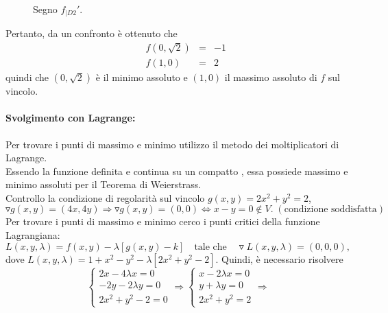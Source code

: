 \begin{example}
\begin{itemize}
\begin{figure}[ht!]
			\caption{Segno $f_{|D2}'$.}
			\label{fig:f'_vincolata_1>0}
		\end{figure}
	\end{itemize}
	Pertanto, da un confronto è ottenuto che
	\begin{equation*}
		\begin{matrix}
			&& f(0,\sqrt{2}) &=&-1\\
			&&f(1,0) &=& 2
		\end{matrix}
	\end{equation*}
	quindi che $(0,\sqrt{2})$ è il minimo assoluto e $(1,0)$ il massimo assoluto di $f$ sul vincolo.
	\paragraph{Svolgimento con Lagrange:} Per trovare i punti di massimo e minimo utilizzo il metodo dei moltiplicatori di Lagrange.\\
	Essendo la funzione definita e continua su un compatto , essa possiede massimo e minimo assoluti per il Teorema di Weierstrass.\\
	Controllo la condizione di regolarità sul vincolo $g(x, y) = 2x^2 + y^2 = 2$,
	\begin{equation*}
		\triangledown g(x,y) = (4x,4y) \Rightarrow \triangledown g(x,y) = (0,0) \iff x - y = 0 \notin V. \; (\text{condizione soddisfatta})
	\end{equation*}
	Per trovare i punti di massimo e minimo cerco i punti critici della funzione Lagrangiana:
	\begin{equation*}
		L(x,y,\lambda) = f(x,y) - \lambda[g(x,y)-k]\quad\text{tale che}\quad\triangledown L(x,y,\lambda) = (0,0,0),
	\end{equation*}
	dove $L(x,y,\lambda) = 1 + x^2 - y^2 - \lambda[2x^2+y^2-2]$. Quindi, è necessario risolvere
	\begin{equation*}
		\begin{cases}
			2x - 4\lambda x = 0\\
			-2y - 2\lambda y =0\\
			2x^2 + y^2 - 2 =0
		\end{cases}\Rightarrow
		\begin{cases}
			x-2\lambda x = 0\\
			y + \lambda y = 0\\
			2x^2 + y^2 = 2
		\end{cases}\Rightarrow

\end{equation*}
\end{example}
